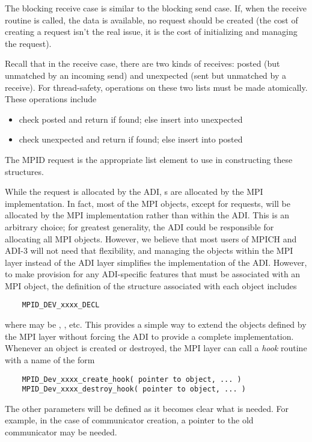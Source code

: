 The blocking receive case is similar to the blocking send case.  If,
when the receive routine is called, the data is available, no request
should be created (the cost of creating a request isn't the real
issue, it is the cost of initializing and managing the request).  

Recall
that in the receive case, there are two kinds of receives: posted (but
unmatched by an incoming send) and unexpected (sent but unmatched by a
receive).  For thread-safety, operations on these two lists must be
made atomically.  These operations include 
\begin{itemize}
\item check posted and return if found; else insert into unexpected 
\item check unexpected and return if found; else insert into posted
\end{itemize}
The MPID request is the appropriate list element to use in
constructing these structures.

While the request is allocated by the ADI, s are
allocated by the MPI implementation.  In fact, most of the MPI
objects, except for requests, will be allocated by the MPI
implementation rather than within the ADI.  This is an arbitrary
choice; for greatest generality, the ADI could be responsible for
allocating all MPI objects.  However, we believe that most users of
MPICH and ADI-3 will not need that flexibility, and managing the
objects within the MPI layer instead of the ADI layer simplifies the
implementation of the ADI.  However, to make provision for any
ADI-specific features that must be associated with an MPI object, the
definition of the structure associated with each object includes
\begin{verbatim}
    MPID_DEV_xxxx_DECL
\end{verbatim}
where  may be , , etc.  This
provides a simple way to extend the objects defined by the MPI layer
without forcing the ADI to provide a complete implementation.
Whenever an object is created or destroyed, the MPI layer can call a
\emph{hook} routine with a name of the form
\begin{verbatim}
    MPID_Dev_xxxx_create_hook( pointer to object, ... )
    MPID_Dev_xxxx_destroy_hook( pointer to object, ... )
\end{verbatim}
The other parameters will be defined as it becomes clear what is needed.  For
example, in the case of communicator creation, a pointer to the old
communicator may be needed.

